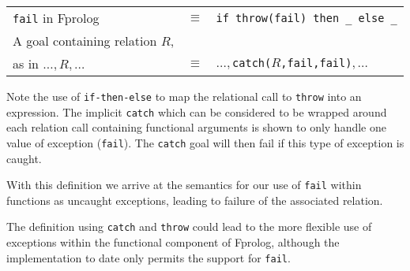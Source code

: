 \documentclass[a4paper,11pt,twoside]{article}
\begin{document}
\begin{tabular}{l l l}
\texttt{fail} in Fprolog       &$\equiv$ &\texttt{if throw(fail) then \_{} else \_{}}\\[4mm]
A goal containing relation $R$, &         &\\
as in $\ldots,R,\ldots$         &$\equiv$ &$\ldots,$\texttt{catch(}$R$\texttt{,fail,fail)}$,\ldots$\\
\end{tabular}

Note the use of \texttt{if-then-else} to map the relational call to
\texttt{throw} into an expression.  The implicit \texttt{catch} which can
be considered to be wrapped around each relation call containing functional
arguments is shown to only handle one value of exception (\texttt{fail}).
The \texttt{catch} goal will then fail if this type of exception is
caught.

With this definition we arrive at the semantics for our use of
\texttt{fail} within functions as uncaught exceptions, leading to
failure of the associated relation.

The definition using \texttt{catch} and \texttt{throw}
could lead to the more flexible use of exceptions within
the functional component of Fprolog,  although the implementation to
date only permits the support for \texttt{fail}.
\end{document}
